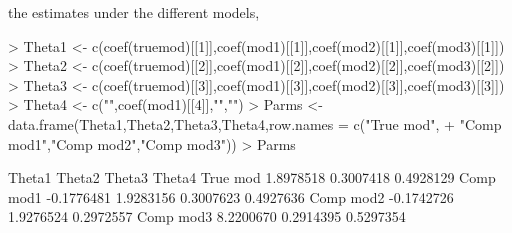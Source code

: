 the estimates under the different models,
\begin{Schunk}
\begin{Sinput}
> Theta1 <- c(coef(truemod)[[1]],coef(mod1)[[1]],coef(mod2)[[1]],coef(mod3)[[1]])
> Theta2 <- c(coef(truemod)[[2]],coef(mod1)[[2]],coef(mod2)[[2]],coef(mod3)[[2]])
> Theta3 <- c(coef(truemod)[[3]],coef(mod1)[[3]],coef(mod2)[[3]],coef(mod3)[[3]])
> Theta4 <- c("",coef(mod1)[[4]],"","")
> Parms  <- data.frame(Theta1,Theta2,Theta3,Theta4,row.names = c("True mod",
+                      "Comp mod1","Comp mod2","Comp mod3"))
> Parms
\end{Sinput}
\begin{Soutput}
              Theta1    Theta2    Theta3    Theta4
True mod   1.8978518 0.3007418 0.4928129
Comp mod1 -0.1776481 1.9283156 0.3007623 0.4927636
Comp mod2 -0.1742726 1.9276524 0.2972557
Comp mod3  8.2200670 0.2914395 0.5297354
\end{Soutput}
\end{Schunk}

